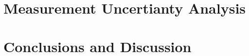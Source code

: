 \documentclass[12pt,a4paper]{article}
\begin{document}


\doublespacing 
\newpage







\section{Measurement Uncertianty Analysis}

\section{Conclusions and Discussion}

\end{document}
